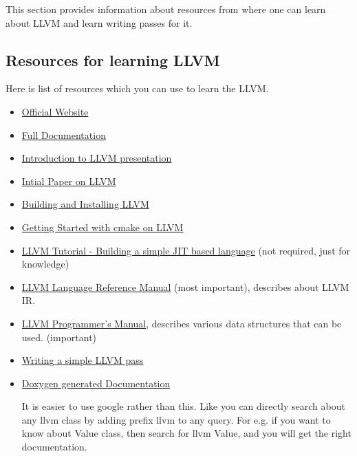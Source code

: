 This section provides information about resources from where one can learn
about LLVM and learn writing passes for it.

\subsection{Resources for learning LLVM}
Here is list of resources which you can use to learn the LLVM.

\begin{itemize}
 \item \href{http://llvm.org}{Official Website}
 \item \href{http://llvm.org/docs}{Full Documentation}
 \item \href{http://llvm.org/pubs/2008-10-04-ACAT-LLVM-Intro.pdf}{Introduction to LLVM presentation}
 \item \href{http://llvm.org/pubs/2004-01-30-CGO-LLVM.pdf}{Intial Paper on LLVM}
 \item \href{http://llvm.org/docs/GettingStarted.html}{Building and Installing LLVM}
 \item \href{http://llvm.org/docs/CMake.html}{Getting Started with cmake on LLVM}
 \item \href{http://llvm.org/docs/tutorial/index.html}{LLVM Tutorial - Building a simple JIT based language}
 (not required, just for knowledge)
 \item \href{http://llvm.org/docs/LangRef.html}{LLVM Language Reference Manual}
 (most important), describes about LLVM IR.
 \item \href{http://llvm.org/docs/ProgrammersManual.html}{LLVM Programmer's Manual},
 describes various data structures that can be used. (important)
 \item \href{http://llvm.org/docs/WritingAnLLVMPass.html}{Writing a simple LLVM pass}
 \item \href{http://llvm.org/doxygen/}{Doxygen generated Documentation}

It is easier to use google rather than this. Like you can directly search about any llvm class by adding prefix llvm to any query. For e.g. if you want to know about Value class, then search for llvm Value, and you will get the right documentation.
\end{itemize}
